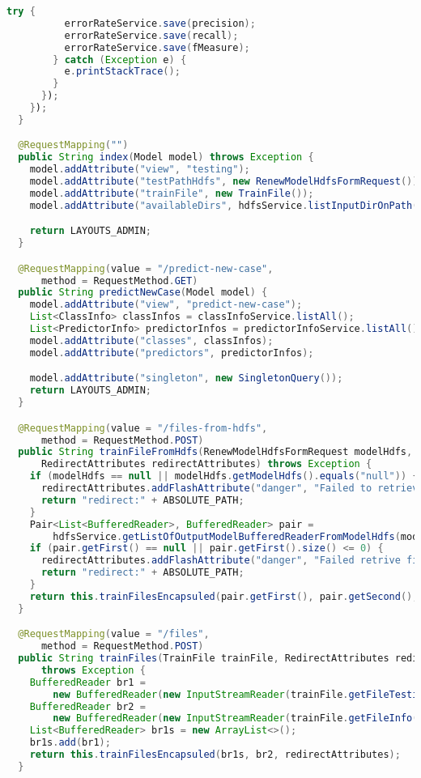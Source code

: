 \begin{lstlisting}[language=Java,basicstyle=\tiny,caption=TestingController.java]
        try {
          errorRateService.save(precision);
          errorRateService.save(recall);
          errorRateService.save(fMeasure);
        } catch (Exception e) {
          e.printStackTrace();
        }
      });
    });
  }

  @RequestMapping("")
  public String index(Model model) throws Exception {
    model.addAttribute("view", "testing");
    model.addAttribute("testPathHdfs", new RenewModelHdfsFormRequest());
    model.addAttribute("trainFile", new TrainFile());
    model.addAttribute("availableDirs", hdfsService.listInputDirOnPath());

    return LAYOUTS_ADMIN;
  }

  @RequestMapping(value = "/predict-new-case",
      method = RequestMethod.GET)
  public String predictNewCase(Model model) {
    model.addAttribute("view", "predict-new-case");
    List<ClassInfo> classInfos = classInfoService.listAll();
    List<PredictorInfo> predictorInfos = predictorInfoService.listAll();
    model.addAttribute("classes", classInfos);
    model.addAttribute("predictors", predictorInfos);

    model.addAttribute("singleton", new SingletonQuery());
    return LAYOUTS_ADMIN;
  }

  @RequestMapping(value = "/files-from-hdfs",
      method = RequestMethod.POST)
  public String trainFileFromHdfs(RenewModelHdfsFormRequest modelHdfs,
      RedirectAttributes redirectAttributes) throws Exception {
    if (modelHdfs == null || modelHdfs.getModelHdfs().equals("null")) {
      redirectAttributes.addFlashAttribute("danger", "Failed to retrieve file from HDFS.");
      return "redirect:" + ABSOLUTE_PATH;
    }
    Pair<List<BufferedReader>, BufferedReader> pair =
        hdfsService.getListOfOutputModelBufferedReaderFromModelHdfs(modelHdfs.getModelHdfs());
    if (pair.getFirst() == null || pair.getFirst().size() <= 0) {
      redirectAttributes.addFlashAttribute("danger", "Failed retrive file from HDFS");
      return "redirect:" + ABSOLUTE_PATH;
    }
    return this.trainFilesEncapsuled(pair.getFirst(), pair.getSecond(), redirectAttributes);
  }

  @RequestMapping(value = "/files",
      method = RequestMethod.POST)
  public String trainFiles(TrainFile trainFile, RedirectAttributes redirectAttributes)
      throws Exception {
    BufferedReader br1 =
        new BufferedReader(new InputStreamReader(trainFile.getFileTesting()[0].getInputStream()));
    BufferedReader br2 =
        new BufferedReader(new InputStreamReader(trainFile.getFileInfo()[0].getInputStream()));
    List<BufferedReader> br1s = new ArrayList<>();
    br1s.add(br1);
    return this.trainFilesEncapsuled(br1s, br2, redirectAttributes);
  }


\end{lstlisting}
